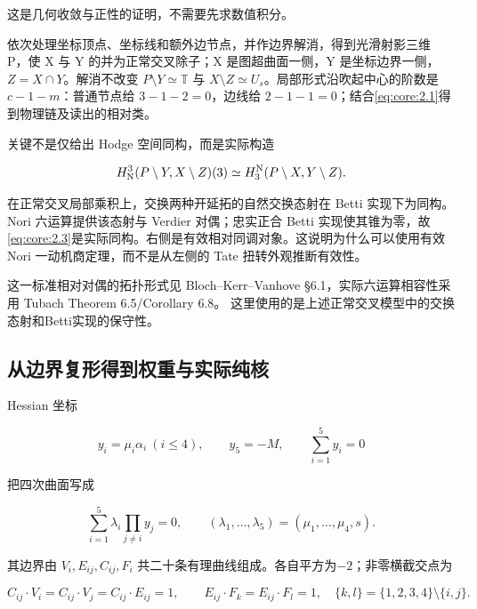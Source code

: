 \documentclass[11pt,a4paper,oneside]{ctexart}
\theoremstyle{cnplain}
\theoremstyle{definition}
\theoremstyle{remark}
\numberwithin{equation}{section}
\begin{document}
这是几何收敛与正性的证明，不需要先求数值积分。

依次处理坐标顶点、坐标线和额外边节点，并作边界解消，得到光滑射影三维 P，使 X 与 Y 的并为正常交叉除子；X 是图超曲面一侧，Y 是坐标边界一侧，\(Z=X\cap Y\)。解消不改变 \(P\setminus Y\simeq\mathbb T\) 与 \(X\setminus Z\simeq U_s\)。局部形式沿吹起中心的阶数是 \(c- 1- m\)：普通节点给 \(3- 1- 2=0\)，边线给 \(2- 1- 1=0\)；结合\eqref{eq:core:2.1}得到物理链及读出的相对类。

关键不是仅给出 Hodge 空间同构，而是实际构造

\begin{equation}
H^3_{\rm N}(P\setminus Y,X\setminus Z)(3)
       \simeq H^{\rm N}_3(P\setminus X,Y\setminus Z).   \label{eq:core:2.3}
\end{equation}

在正常交叉局部乘积上，交换两种开延拓的自然交换态射在 Betti 实现下为同构。Nori 六运算提供该态射与 Verdier 对偶；忠实正合 Betti 实现使其锥为零，故\eqref{eq:core:2.3}是实际同构。右侧是有效相对同调对象。这说明为什么可以使用有效 Nori 一动机商定理，而不是从左侧的 Tate 扭转外观推断有效性。

这一标准相对对偶的拓扑形式见 Bloch--Kerr--Vanhove §6.1，实际六运算相容性采用 Tubach Theorem 6.5/Corollary 6.8。\cite{bkv,tubach} 这里使用的是上述正常交叉模型中的交换态射和Betti实现的保守性。


\subsection{从边界复形得到权重与实际纯核}\label{sec:core:3}

Hessian 坐标

\begin{equation}
y_i=\mu_i\alpha_i\ (i\leq4),\qquad y_5=-M,\qquad
 \sum_{i=1}^5y_i=0
\end{equation}

把四次曲面写成

\begin{equation}
\sum_{i=1}^5\lambda_i\prod_{j\ne i}y_j=0,
 \qquad (\lambda_1,\ldots,\lambda_5)=(\mu_1,\ldots,\mu_4,s).
                                                               \label{eq:core:3.1}
\end{equation}

其边界由 \(V_i,E_{ij},C_{ij},F_i\) 共二十条有理曲线组成。各自平方为\(- 2\)；非零横截交点为

\begin{equation}
C_{ij}\cdot V_i=C_{ij}\cdot V_j=C_{ij}\cdot E_{ij}=1,
 \qquad E_{ij}\cdot F_k=E_{ij}\cdot F_l=1,
 \quad\{k,l\}=\{1,2,3,4\}\setminus\{i,j\}.             \label{eq:core:3.2}
\end{equation}
\end{document}
